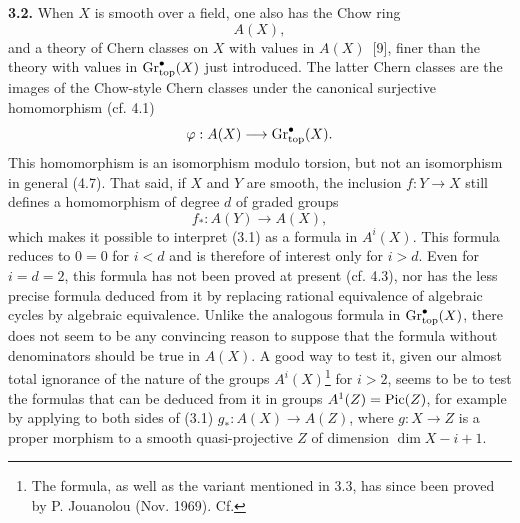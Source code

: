 \textbf{3.2.} When $X$ is smooth over a field, one also has the Chow ring
\[
  A(X),
\]
and a theory of Chern classes on $X$ with values in $A(X)$~[9], finer than the theory with values in $\operatorname{Gr}_{\mathrm{top}}^\bullet(X)$ just introduced. The latter Chern classes are the images of the Chow-style Chern classes under the canonical surjective homomorphism (cf. 4.1)
\[
  \varphi:A(X)\longrightarrow\operatorname{Gr}_{\mathrm{top}}^\bullet(X).
\]
This homomorphism is an isomorphism modulo torsion, but not an isomorphism in general (4.7). That said, if $X$ and $Y$ are smooth, the inclusion $f:Y\to X$ still defines a homomorphism of degree $d$ of graded groups
\[
  f_*:A(Y)\longrightarrow A(X),
\]
which makes it possible to interpret (3.1) as a formula in $A^i(X)$.
This formula reduces to $0=0$ for $i<d$ and is therefore of interest
only for $i>d$. Even for $i=d=2$, this formula has not been proved at
present (cf. 4.3), nor has the less precise formula deduced from it by
replacing rational equivalence of algebraic cycles by algebraic
equivalence. Unlike the analogous formula in $\operatorname{Gr}_{\mathrm{top}}^\bullet(X)$, there
does not seem to be any convincing reason to suppose that the formula
without denominators should be true in $A(X)$. A good way to test it,
given our almost total ignorance of the nature of the groups
$A^i(X)$\footnote{The formula, as well as the variant mentioned in 3.3,
has since been proved by P. Jouanolou (Nov. 1969). Cf.} for $i>2$, seems
to be to test the formulas that can be deduced from it in groups
$A^1(Z)=\operatorname{Pic}(Z)$, for example by applying to both sides of (3.1)
$g_*:A(X)\longrightarrow A(Z)$,
where $g:X\to Z$ is a proper morphism to a smooth quasi-projective $Z$ of dimension $\dim X-i+1$.

